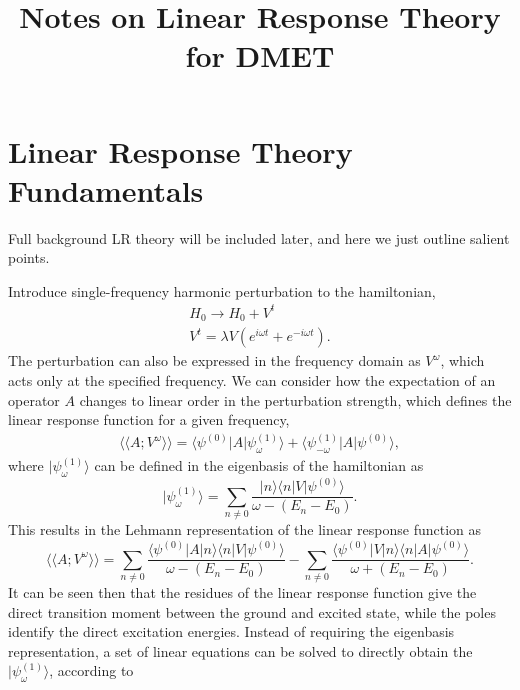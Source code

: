 \documentclass[a4paper,oneside,11pt]{article}
\numberwithin{equation}{section}
\begin{document}
\title{Notes on Linear Response Theory for DMET}
\date{}
\maketitle

\section{Linear Response Theory Fundamentals}
Full background LR theory will be included later, and here we just outline salient points.

Introduce single-frequency harmonic perturbation to the hamiltonian,
\begin{eqnarray}
H_0 \rightarrow H_0 + V^t \\
V^t = \lambda V (e^{i \omega t}+e^{-i \omega t}) .
\end{eqnarray}
The perturbation can also be expressed in the frequency domain as $V^{\omega}$, which acts only at the specified frequency.
We can consider how the expectation of an operator $A$ changes to linear order in the perturbation strength, which defines
the linear response function for a given frequency,
\begin{eqnarray}
\langle \langle A ; V^{\omega} \rangle \rangle = \langle \psi^{(0)} | A | \psi^{(1)}_{\omega} \rangle + \langle \psi^{(1)}_{-\omega} | A | \psi^{(0)} \rangle  ,   \label{LRFunc}
\end{eqnarray}
where $|\psi^{(1)}_{\omega}\rangle$ can be defined in the eigenbasis of the hamiltonian as
\begin{equation}
| \psi^{(1)}_{\omega} \rangle = \sum_{n \neq 0} \frac{ | n \rangle \langle n | V | \psi^{(0)} \rangle}{\omega - (E_n - E_0)} . 
\end{equation}
This results in the Lehmann representation of the linear response function as
\begin{equation}
\langle \langle A ; V^{\omega} \rangle \rangle = \sum_{n \neq 0} \frac{\langle \psi^{(0)} | A | n \rangle \langle n | V | \psi^{(0)} \rangle}{\omega - (E_n - E_0)} - \sum_{n \neq 0} \frac{\langle \psi^{(0)} | V | n \rangle \langle n | A | \psi^{(0)} \rangle}{\omega + (E_n - E_0)} .  \label{Lehmann}
\end{equation}
It can be seen then that the residues of the linear response function give the direct transition moment between the ground and excited state, while the poles identify the direct excitation energies.
Instead of requiring the eigenbasis representation, a set of linear equations can be solved to directly obtain the $|\psi^{(1)}_{\omega}\rangle$, according to
\end{document}
